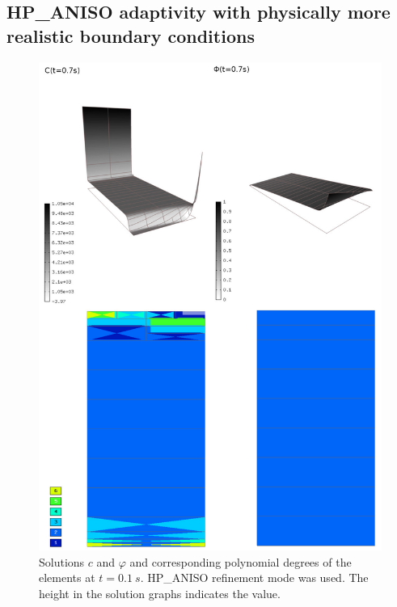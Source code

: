\subsection{HP\_ANISO adaptivity with physically more realistic boundary conditions}
\begin{figure}[!ht]
  \begin{centering}
  \includegraphics[width=\columnwidth]{cphiorders}
  \caption{\label{fig:cphi-orders} Solutions $c$ and $\varphi$
  and corresponding polynomial degrees of the elements at
  $t=0.1\ s$. HP\_ANISO refinement mode was used. The height
  in the solution graphs indicates the value.}
  \end{centering}
\end{figure}

